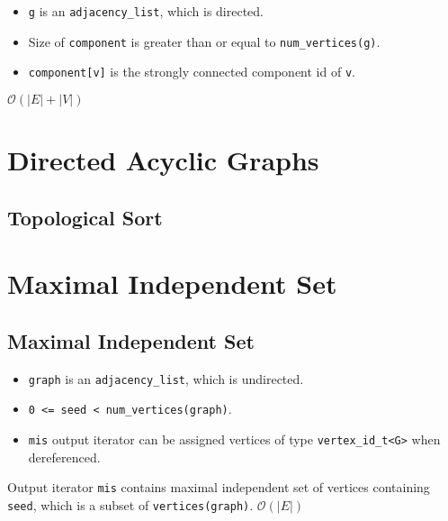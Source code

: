 {\small
      
}
\begin{itemdescr}
      \pnum\preconditions
      \begin{itemize}
            \item
                  \lstinline{g} is an \lstinline{adjacency_list}, which is directed.
            \item
                  Size of \lstinline{component} is greater than or equal to \lstinline{num_vertices(g)}.
      \end{itemize}
      \pnum\effects
      \begin{itemize}
            \item
                  \lstinline{component[v]} is the strongly connected component id of \lstinline{v}.
      \end{itemize}

      \pnum\complexity $\mathcal{O}(|E|+|V|)$
\end{itemdescr}

\section{Directed Acyclic Graphs}
\subsection{Topological Sort}

\section{Maximal Independent Set}
\subsection{Maximal Independent Set}

{\small
      
}
\begin{itemdescr}
      \pnum\preconditions
      \begin{itemize}
            \item
                  \lstinline{graph} is an \lstinline{adjacency_list}, which is undirected.
            \item
                  \lstinline{0 <= seed < num_vertices(graph)}.
            \item
                  \lstinline{mis} output iterator can be assigned vertices of type \lstinline{vertex_id_t<G>} when dereferenced.
      \end{itemize}
      \pnum\effects Output iterator \lstinline{mis} contains maximal independent set of vertices containing \lstinline{seed}, which is a subset of \lstinline{vertices(graph)}.
      \pnum\complexity $\mathcal{O}(|E|)$
\end{itemdescr}

